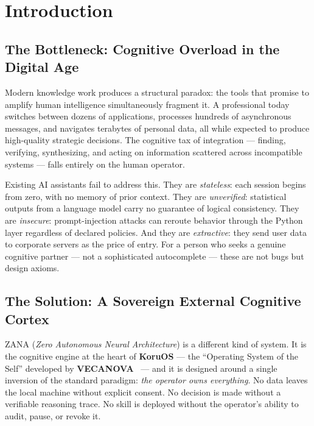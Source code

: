 \documentclass[12pt,a4paper]{article}
\begin{document}
\section{Introduction}

\subsection*{The Bottleneck: Cognitive Overload in the Digital Age}

Modern knowledge work produces a structural paradox: the tools that promise to amplify human
intelligence simultaneously fragment it. A professional today switches between dozens of
applications, processes hundreds of asynchronous messages, and navigates terabytes of
personal data, all while expected to produce high-quality strategic decisions.
The cognitive tax of integration --- finding, verifying, synthesizing, and acting on
information scattered across incompatible systems --- falls entirely on the human operator.

Existing AI assistants fail to address this. They are \emph{stateless}: each session
begins from zero, with no memory of prior context. They are \emph{unverified}: statistical
outputs from a language model carry no guarantee of logical consistency. They are
\emph{insecure}: prompt-injection attacks can reroute behavior through the Python layer
regardless of declared policies. And they are \emph{extractive}: they send user data to
corporate servers as the price of entry. For a person who seeks a genuine cognitive
partner --- not a sophisticated autocomplete --- these are not bugs but design axioms.

\subsection*{The Solution: A Sovereign External Cognitive Cortex}

ZANA (\emph{Zero Autonomous Neural Architecture}) is a different kind of system.
It is the cognitive engine at the heart of \textbf{KoruOS} --- the ``Operating System
of the Self'' developed by \textbf{VECANOVA}~\cite{vecanova2026} --- and it is designed
around a single inversion of the standard paradigm: \emph{the operator owns everything}.
No data leaves the local machine without explicit consent. No decision is made without a
verifiable reasoning trace. No skill is deployed without the operator's ability to audit,
pause, or revoke it.
\end{document}
